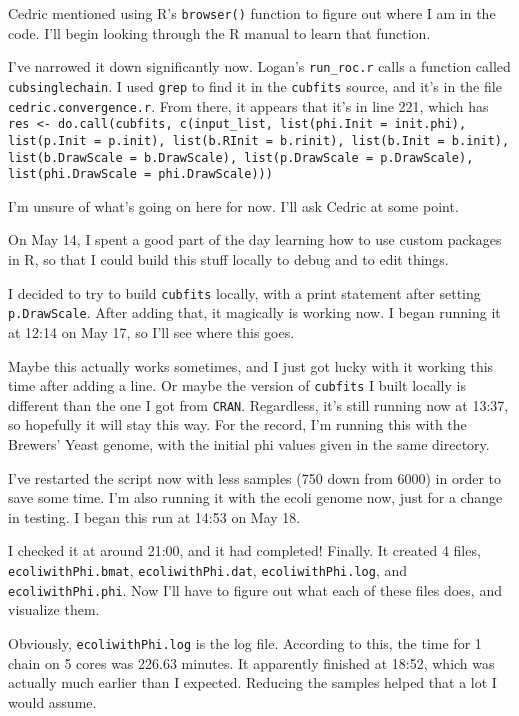 \documentclass[12 pt]{article}
\begin{document}
\begin{enumerate}
				Cedric mentioned using R's \texttt{browser()} function to figure out where I am in the code. I'll begin looking through the R manual to learn that function.
				
				I've narrowed it down significantly now. Logan's \texttt{run\_roc.r} calls a function called \texttt{cubsinglechain}. I used \texttt{grep} to find it in the \texttt{cubfits} source, and it's in the file \texttt{cedric.convergence.r}. From there, it appears that it's in line 221, which has \texttt{res <- do.call(cubfits, c(input\_list, list(phi.Init = init.phi), list(p.Init = p.init), list(b.RInit = b.rinit), list(b.Init = b.init),
					list(b.DrawScale = b.DrawScale), list(p.DrawScale = p.DrawScale), list(phi.DrawScale = phi.DrawScale)))
					} 
					
				I'm unsure of what's going on here for now. I'll ask Cedric at some point.
				
				On May 14, I spent a good part of the day learning how to use custom packages in R, so that I could build this stuff locally to debug and to edit things. 
				
				I decided to try to build \texttt{cubfits} locally, with a print statement after setting \texttt{p.DrawScale}. After adding that, it magically is working now. I began running it at 12:14 on May 17, so I'll see where this goes. 
				
				Maybe this actually works sometimes, and I just got lucky with it working this time after adding a line. Or maybe the version of \texttt{cubfits} I built locally is different than the one I got from \texttt{CRAN}. Regardless, it's still running now at 13:37, so hopefully it will stay this way. For the record, I'm running this with the Brewers' Yeast genome, with the initial phi values given in the same directory.
				
				I've restarted the script now with less samples (750 down from 6000) in order to save some time. I'm also running it with the ecoli genome now, just for a change in testing. I began this run at 14:53 on May 18. 
				
				I checked it at around 21:00, and it had completed! Finally. It created 4 files, \texttt{ecoliwithPhi.bmat}, \texttt{ecoliwithPhi.dat}, \texttt{ecoliwithPhi.log}, and \texttt{ecoliwithPhi.phi}. Now I'll have to figure out what each of these files does, and visualize them.
				
				Obviously, \texttt{ecoliwithPhi.log} is the log file. According to this, the time for 1 chain on 5 cores was 226.63 minutes. It apparently finished at 18:52, which was actually much earlier than I expected. Reducing the samples helped that a lot I would assume.
				

\end{enumerate}
\end{document}
